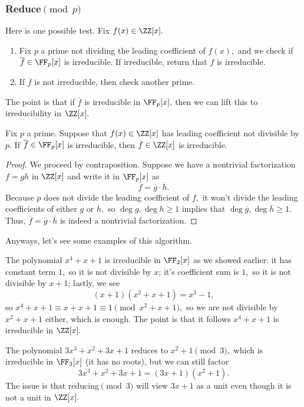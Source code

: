 \subsubsection{Reduce\texorpdfstring{$\pmod p$}{}}
Here is one possible test. Fix $f(x)\in\ZZ[x].$
\begin{enumerate}
	\item Fix $p$ a prime not dividing the leading coefficient of $f(x),$ and we check if $\overline f\in\FF_p[x]$ is irreducible. If irreducible, return that $f$ is irreducible.
	\item If $\overline f$ is not irreducible, then check another prime.
\end{enumerate}
The point is that if $\overline f$ is irreducible in $\FF_p[x],$ then we can lift this to irreducibility in $\ZZ[x].$
\begin{lemma}
	Fix $p$ a prime. Suppose that $f(x)\in\ZZ[x]$ has leading coefficient not divisible by $p.$ If $\overline f\in\FF_p[x]$ is irreducible, then $f\in\ZZ[x]$ is irreducible.
\end{lemma}
\begin{proof}
	We proceed by contraposition. Suppose we have a nontrivial factorization $f=gh$ in $\ZZ[x]$ and write it in $\FF_p[x]$ as
	\[\overline f=\overline g\cdot\overline h.\]
	Because $p$ does not divide the leading coefficient of $f,$ it won't divide the leading coefficients of either $g$ or $h,$ so $\deg g,\deg h\ge1$ implies that $\deg\overline g,\deg\overline h\ge1.$ Thus, $\overline f=\overline g\cdot\overline h$ is indeed a nontrivial factorization.
\end{proof}
Anyways, let's see some examples of this algorithm.
\begin{example}
	The polynomial $x^4+x+1$ is irreducible in $\FF_2[x]$ as we showed earlier: it has constant term $1,$ so it is not divisible by $x$; it's coefficient sum is $1,$ so it is not divisible by $x+1$; lastly, we see
	\[(x+1)\left(x^2+x+1\right)=x^3-1,\]
	so $x^4+x+1\equiv x+x+1\equiv1\pmod{x^2+x+1},$ so we are not divisible by $x^2+x+1$ either, which is enough. The point is that it follows $x^4+x+1$ is irreducible in $\ZZ[x].$
\end{example}
\begin{nex}
	The polynomial $3x^3+x^2+3x+1$ reduces to $x^2+1\pmod3,$ which is irreducible in $\FF_3[x]$ (it has no roots), but we can still factor
	\[3x^3+x^2+3x+1=(3x+1)\left(x^2+1\right).\]
	The issue is that reducing$\pmod3$ will view $3x+1$ as a unit even though it is not a unit in $\ZZ[x].$
\end{nex}
